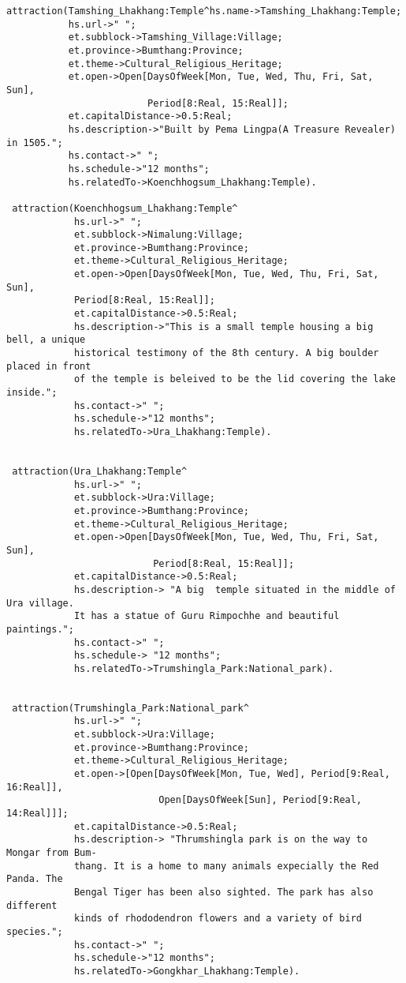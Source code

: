 \begin{verbatim}
attraction(Tamshing_Lhakhang:Temple^hs.name->Tamshing_Lhakhang:Temple;
           hs.url->" ";
           et.subblock->Tamshing_Village:Village;
           et.province->Bumthang:Province;
           et.theme->Cultural_Religious_Heritage;
           et.open->Open[DaysOfWeek[Mon, Tue, Wed, Thu, Fri, Sat, Sun],
                         Period[8:Real, 15:Real]];
           et.capitalDistance->0.5:Real;
           hs.description->"Built by Pema Lingpa(A Treasure Revealer) in 1505.";
           hs.contact->" ";
           hs.schedule->"12 months";
           hs.relatedTo->Koenchhogsum_Lhakhang:Temple).
                             
 attraction(Koenchhogsum_Lhakhang:Temple^
            hs.url->" ";
            et.subblock->Nimalung:Village;
            et.province->Bumthang:Province;
            et.theme->Cultural_Religious_Heritage;
            et.open->Open[DaysOfWeek[Mon, Tue, Wed, Thu, Fri, Sat, Sun],
            Period[8:Real, 15:Real]];
            et.capitalDistance->0.5:Real;
            hs.description->"This is a small temple housing a big bell, a unique 
            historical testimony of the 8th century. A big boulder placed in front 
            of the temple is beleived to be the lid covering the lake inside.";
            hs.contact->" ";
            hs.schedule->"12 months";
            hs.relatedTo->Ura_Lhakhang:Temple).


 attraction(Ura_Lhakhang:Temple^
            hs.url->" ";
            et.subblock->Ura:Village;
            et.province->Bumthang:Province;
            et.theme->Cultural_Religious_Heritage;
            et.open->Open[DaysOfWeek[Mon, Tue, Wed, Thu, Fri, Sat, Sun],
                          Period[8:Real, 15:Real]];
            et.capitalDistance->0.5:Real;
            hs.description-> "A big  temple situated in the middle of Ura village.
            It has a statue of Guru Rimpochhe and beautiful paintings.";
            hs.contact->" ";
            hs.schedule-> "12 months";
            hs.relatedTo->Trumshingla_Park:National_park).
          

 attraction(Trumshingla_Park:National_park^
            hs.url->" ";
            et.subblock->Ura:Village;
            et.province->Bumthang:Province;
            et.theme->Cultural_Religious_Heritage;
            et.open->[Open[DaysOfWeek[Mon, Tue, Wed], Period[9:Real, 16:Real]],
                           Open[DaysOfWeek[Sun], Period[9:Real, 14:Real]]];
            et.capitalDistance->0.5:Real;
            hs.description-> "Thrumshingla park is on the way to Mongar from Bum-
            thang. It is a home to many animals expecially the Red Panda. The 
            Bengal Tiger has been also sighted. The park has also different 
            kinds of rhododendron flowers and a variety of bird species.";
            hs.contact->" ";
            hs.schedule->"12 months";
            hs.relatedTo->Gongkhar_Lhakhang:Temple).                                 
      

\end{verbatim}
